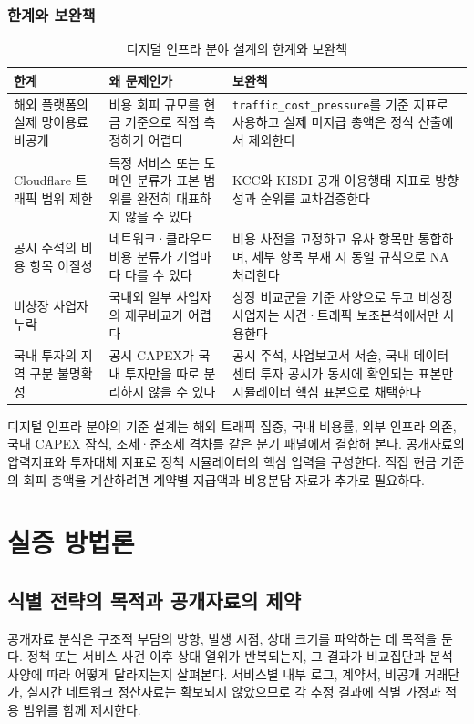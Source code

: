 \documentclass[11pt,a4paper]{report}
\begin{document}
\subsection{한계와 보완책}
\begin{table}[H]
  \centering
  \small
  \caption{디지털 인프라 분야 설계의 한계와 보완책}\label{tab:infra_limitations}
  \begin{tabular}{L{4.1cm}L{4.8cm}L{4.1cm}}
    \toprule
    한계 & 왜 문제인가 & 보완책 \\
    \midrule
    해외 플랫폼의 실제 망이용료 비공개 & 비용 회피 규모를 현금 기준으로 직접 측정하기 어렵다 & \texttt{traffic\_cost\_pressure}를 기준 지표로 사용하고 실제 미지급 총액은 정식 산출에서 제외한다 \\
    Cloudflare 트래픽 범위 제한 & 특정 서비스 또는 도메인 분류가 표본 범위를 완전히 대표하지 않을 수 있다 & KCC와 KISDI 공개 이용행태 지표로 방향성과 순위를 교차검증한다 \\
    공시 주석의 비용 항목 이질성 & 네트워크·클라우드 비용 분류가 기업마다 다를 수 있다 & 비용 사전을 고정하고 유사 항목만 통합하며, 세부 항목 부재 시 동일 규칙으로 NA 처리한다 \\
    비상장 사업자 누락 & 국내외 일부 사업자의 재무비교가 어렵다 & 상장 비교군을 기준 사양으로 두고 비상장 사업자는 사건·트래픽 보조분석에서만 사용한다 \\
    국내 투자의 지역 구분 불명확성 & 공시 CAPEX가 국내 투자만을 따로 분리하지 않을 수 있다 & 공시 주석, 사업보고서 서술, 국내 데이터센터 투자 공시가 동시에 확인되는 표본만 시뮬레이터 핵심 표본으로 채택한다 \\
    \bottomrule
  \end{tabular}
\end{table}

디지털 인프라 분야의 기준 설계는 해외 트래픽 집중, 국내 비용률, 외부 인프라 의존, 국내 CAPEX 잠식, 조세·준조세 격차를 같은 분기 패널에서 결합해 본다. 공개자료의 압력지표와 투자대체 지표로 정책 시뮬레이터의 핵심 입력을 구성한다. 직접 현금 기준의 회피 총액을 계산하려면 계약별 지급액과 비용분담 자료가 추가로 필요하다.

\chapter{실증 방법론}
\section{식별 전략의 목적과 공개자료의 제약}
공개자료 분석은 구조적 부담의 방향, 발생 시점, 상대 크기를 파악하는 데 목적을 둔다. 정책 또는 서비스 사건 이후 상대 열위가 반복되는지, 그 결과가 비교집단과 분석 사양에 따라 어떻게 달라지는지 살펴본다. 서비스별 내부 로그, 계약서, 비공개 거래단가, 실시간 네트워크 정산자료는 확보되지 않았으므로 각 추정 결과에 식별 가정과 적용 범위를 함께 제시한다.
\end{document}
